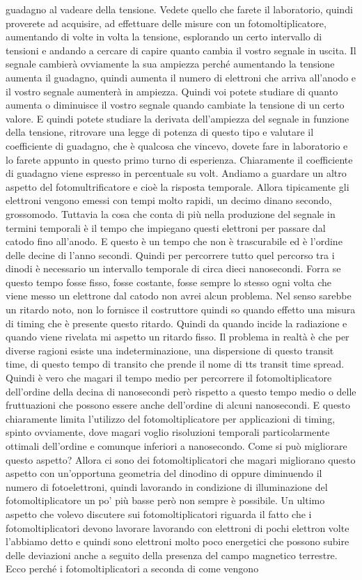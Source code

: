 guadagno al vadeare della tensione. Vedete quello che farete il laboratorio, quindi proverete ad acquisire, ad effettuare delle misure con un fotomoltiplicatore, aumentando di volte in volta la tensione, esplorando un certo intervallo di tensioni e andando a cercare di capire quanto cambia il vostro segnale in uscita. Il segnale cambierà ovviamente la sua ampiezza perché aumentando la tensione aumenta il guadagno, quindi aumenta il numero di elettroni che arriva all'anodo e il vostro segnale aumenterà in ampiezza. Quindi voi potete studiare di quanto aumenta o diminuisce il vostro segnale quando cambiate la tensione di un certo valore. E quindi potete studiare la derivata dell'ampiezza del segnale in funzione della tensione, ritrovare una legge di potenza di questo tipo e valutare il coefficiente di guadagno, che è qualcosa che vincevo, dovete fare in laboratorio e lo farete appunto in questo primo turno di esperienza. Chiaramente il coefficiente di guadagno viene espresso in percentuale su volt. Andiamo a guardare un altro aspetto del fotomultrificatore e cioè la risposta temporale. Allora tipicamente gli elettroni vengono emessi con tempi molto rapidi, un decimo dinano secondo, grossomodo. Tuttavia la cosa che conta di più nella produzione del segnale in termini temporali è il tempo che impiegano questi elettroni per passare dal catodo fino all'anodo. E questo è un tempo che non è trascurabile ed è l'ordine delle decine di l'anno secondi. Quindi per percorrere tutto quel percorso tra i dinodi è necessario un intervallo temporale di circa dieci nanosecondi. Forra se questo tempo fosse fisso, fosse costante, fosse sempre lo stesso ogni volta che viene messo un elettrone dal catodo non avrei alcun problema. Nel senso sarebbe un ritardo noto, non lo fornisce il costruttore quindi so quando effetto una misura di timing che è presente questo ritardo. Quindi da quando incide la radiazione e quando viene rivelata mi aspetto un ritardo fisso. Il problema in realtà è che per diverse ragioni esiste una indeterminazione, una dispersione di questo transit time, di questo tempo di transito che prende il nome di tts transit time spread. Quindi è vero che magari il tempo medio per percorrere il fotomoltiplicatore dell'ordine della decina di nanosecondi però rispetto a questo tempo medio o delle fruttuazioni che possono essere anche dell'ordine di alcuni nanosecondi. E questo chiaramente limita l'utilizzo del fotomoltiplicatore per applicazioni di timing, spinto ovviamente, dove magari voglio risoluzioni temporali particolarmente ottimali dell'ordine e comunque inferiori a nanosecondo. Come si può migliorare questo aspetto? Allora ci sono dei fotomoltiplicatori che magari migliorano questo aspetto con un'opportuna geometria del dinodino di oppure diminuendo il numero di fotoelettroni, quindi lavorando in condizione di illuminazione del fotomoltiplicatore un po' più basse però non sempre è possibile. Un ultimo aspetto che volevo discutere sui fotomoltiplicatori riguarda il fatto che i fotomoltiplicatori devono lavorare lavorando con elettroni di pochi elettron volte l'abbiamo detto e quindi sono elettroni molto poco energetici che possono subire delle deviazioni anche a seguito della presenza del campo magnetico terrestre. Ecco perché i fotomoltiplicatori a seconda di come vengono 